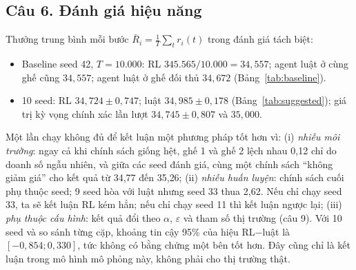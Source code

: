 \documentclass[12pt,a4paper]{report}
\begin{document}
\subsection*{Câu 6. Đánh giá hiệu năng}
Thưởng trung bình mỗi bước $\bar R_i=\frac1T\sum_t r_i(t)$ trong đánh giá tách biệt:
\begin{itemize}
\item Baseline seed 42, $T=10.000$: RL $345.565/10.000=34{,}557$; agent luật ở cùng
  ghế cũng $34{,}557$; agent luật ở ghế đối thủ $34{,}672$ (Bảng~\ref{tab:baseline}).
\item 10 seed: RL $34{,}724\pm0{,}747$; luật $34{,}985\pm0{,}178$
  (Bảng~\ref{tab:suggested}); giá trị kỳ vọng chính xác lần lượt
  $34{,}745\pm0{,}807$ và $35{,}000$.
\end{itemize}
Một lần chạy không đủ để kết luận một phương pháp tốt hơn vì:
(i) \emph{nhiễu môi trường}: ngay cả khi chính sách giống hệt, ghế 1 và ghế 2 lệch
nhau 0{,}12 chỉ do doanh số ngẫu nhiên, và giữa các seed đánh giá, cùng một chính
sách ``không giảm giá'' cho kết quả từ 34{,}77 đến 35{,}26;
(ii) \emph{nhiễu huấn luyện}: chính sách cuối phụ thuộc seed; 9 seed hòa với luật
nhưng seed 33 thua 2{,}62. Nếu chỉ chạy seed 33, ta sẽ kết luận RL kém hẳn; nếu chỉ
chạy seed 11 thì kết luận ngược lại; (iii) \emph{phụ thuộc cấu hình}: kết quả đổi theo
$\alpha$, $\varepsilon$ và tham số thị trường (câu 9). Với 10 seed và so sánh từng
cặp, khoảng tin cậy 95\% của hiệu RL$-$luật là $[-0{,}854;0{,}330]$, tức không có
bằng chứng một bên tốt hơn. Đây cũng chỉ là kết luận trong mô hình mô phỏng này,
không phải cho thị trường thật.

\end{document}

